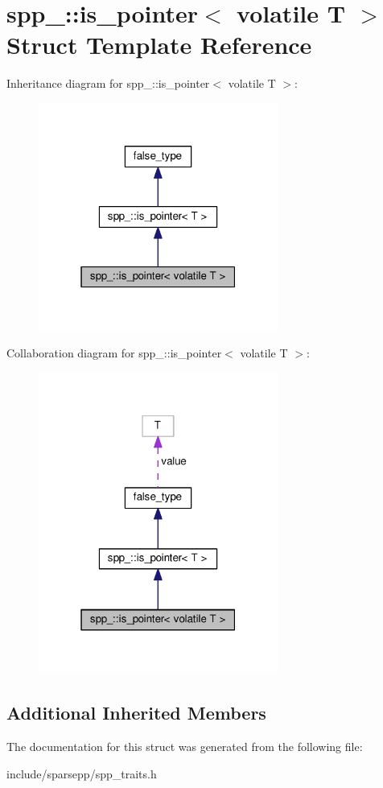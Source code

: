 \hypertarget{structspp___1_1is__pointer_3_01volatile_01_t_01_4}{}\section{spp\+\_\+\+:\+:is\+\_\+pointer$<$ volatile T $>$ Struct Template Reference}
\label{structspp___1_1is__pointer_3_01volatile_01_t_01_4}


Inheritance diagram for spp\+\_\+\+:\+:is\+\_\+pointer$<$ volatile T $>$\+:\nopagebreak
\begin{figure}[H]
\begin{center}
\leavevmode
\includegraphics[width=223pt]{structspp___1_1is__pointer_3_01volatile_01_t_01_4__inherit__graph}
\end{center}
\end{figure}


Collaboration diagram for spp\+\_\+\+:\+:is\+\_\+pointer$<$ volatile T $>$\+:\nopagebreak
\begin{figure}[H]
\begin{center}
\leavevmode
\includegraphics[width=223pt]{structspp___1_1is__pointer_3_01volatile_01_t_01_4__coll__graph}
\end{center}
\end{figure}
\subsection*{Additional Inherited Members}


The documentation for this struct was generated from the following file\+:\begin{DoxyCompactItemize}
\item 
include/sparsepp/spp\+\_\+traits.\+h\end{DoxyCompactItemize}
